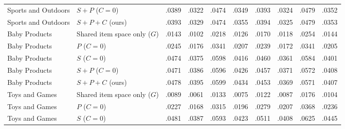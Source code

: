\documentclass[11pt]{article}
\begin{document}
\begin{table}[!t]
{\begin{tabular}{llrrrrrrrr}
Sports and Outdoors & $S+P$ ($C=0$) & .0389 & .0322 & .0474 & .0349 & .0393 & .0324 & .0479 & .0352 \\
Sports and Outdoors & $S+P+C$ (ours) & .0393 & .0329 & .0474 & .0355 & .0394 & .0325 & .0479 & .0353 \\
Baby Products & Shared item space only ($G$) & .0143 & .0102 & .0218 & .0126 & .0170 & .0118 & .0254 & .0144 \\
Baby Products & $P$ ($C=0$) & .0245 & .0176 & .0341 & .0207 & .0239 & .0172 & .0341 & .0205 \\
Baby Products & $S$ ($C=0$) & .0474 & .0375 & .0598 & .0416 & .0460 & .0361 & .0584 & .0401 \\
Baby Products & $S+P$ ($C=0$) & .0471 & .0386 & .0596 & .0426 & .0457 & .0371 & .0572 & .0408 \\
Baby Products & $S+P+C$ (ours) & .0478 & .0395 & .0599 & .0434 & .0453 & .0369 & .0571 & .0407 \\
Toys and Games & Shared item space only ($G$) & .0089 & .0061 & .0133 & .0075 & .0122 & .0087 & .0176 & .0104 \\
Toys and Games & $P$ ($C=0$) & .0227 & .0168 & .0315 & .0196 & .0279 & .0207 & .0368 & .0236 \\
Toys and Games & $S$ ($C=0$) & .0481 & .0387 & .0593 & .0423 & .0511 & .0408 & .0625 & .0445 \\

\end{tabular}}
\end{table}
\end{document}
